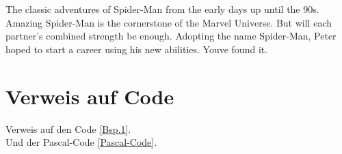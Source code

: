 The classic adventures of Spider-Man from the early days up until the 90s. Amazing Spider-Man is the cornerstone of the Marvel Universe. But will each partner’s combined strength be enough. Adopting the name Spider-Man, Peter hoped to start a career using his new abilities. Youve found it.

\section{Verweis auf Code}
Verweis auf den Code \autoref{Bsp.1}.\\
Und der Pascal-Code \autoref{Pascal-Code}.
